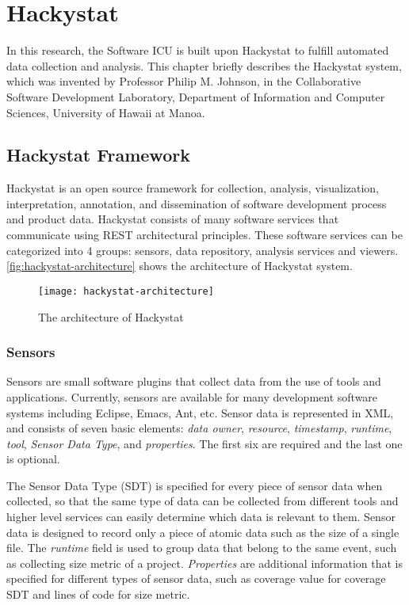 \chapter{Hackystat}
In this research, the Software ICU is built upon Hackystat to fulfill automated data collection and analysis. This chapter briefly describes the Hackystat system, which was invented by Professor Philip M. Johnson, in the Collaborative Software Development Laboratory, Department of Information and Computer Sciences, University of Hawaii at Manoa. 
 
\section{Hackystat Framework}
Hackystat is an open source framework for collection, analysis, visualization, interpretation, annotation, and dissemination of software development process and product data\cite{hackystat}. Hackystat consists of many software services that communicate using REST architectural principles\cite{rest}. These software services can be categorized into 4 groups: sensors, data repository, analysis services and viewers. \autoref{fig:hackystat-architecture} shows the architecture of Hackystat system. 

\begin{figure}[htbp]
   \centering
   \texttt{[image: hackystat-architecture]} 
   \caption{The architecture of Hackystat}
   \label{fig:hackystat-architecture}
\end{figure}

\subsection{Sensors}
Sensors are small software plugins that collect data from the use of tools and applications. Currently, sensors are available for many development software systems including Eclipse, Emacs, Ant, etc. Sensor data is represented in XML, and consists of seven basic elements: {\it data owner}, {\it resource}, {\it timestamp}, {\it runtime}, {\it tool}, {\it Sensor Data Type}, and {\it  properties}. The first six are required and the last one is optional. 

The Sensor Data Type (SDT) is specified for every piece of sensor data when collected, so that the same type of data can be collected from different tools and higher level services can easily determine which data is relevant to them. Sensor data is designed to record only a piece of atomic data such as the size of a single file. The  {\it runtime} field is used to group data that belong to the same event, such as collecting size metric of a project.  {\it Properties} are additional information that is specified for different types of sensor data, such as coverage value for coverage SDT and lines of code for size metric. 

